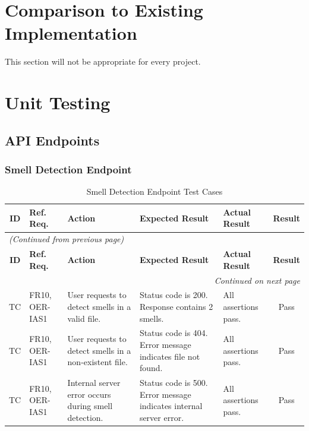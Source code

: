 \documentclass[12pt, titlepage]{article}
\begin{document}
\section{Comparison to Existing Implementation}	

This section will not be appropriate for every project.

\section{Unit Testing}
\newcommand{\testcount}{\stepcounter{testcase}\thetestcase}
\renewcommand{\arraystretch}{1.2} %

\subsection{API Endpoints}

\subsubsection{Smell Detection Endpoint}

\begin{longtable}{c 
  >{\raggedright\arraybackslash}p{1.5cm} 
  >{\raggedright\arraybackslash}p{4.5cm} 
  >{\raggedright\arraybackslash}p{4cm} 
  >{\raggedright\arraybackslash}p{3cm} c}
  \toprule
  \textbf{ID} & \textbf{Ref. Req.} & \textbf{Action} & \textbf{Expected Result} & \textbf{Actual Result} & \textbf{Result} \\ 
  \midrule
  \endfirsthead

  \multicolumn{6}{l}{\textit{(Continued from previous page)}} \\ 
  \toprule
  \textbf{ID} & \textbf{Ref. Req.} & \textbf{Action} & \textbf{Expected Result} & \textbf{Actual Result} & \textbf{Result} \\ 
  \midrule
  \endhead

  \multicolumn{6}{r}{\textit{Continued on next page}} \\
  \endfoot

  \bottomrule
  \caption{Smell Detection Endpoint Test Cases}
  \label{table:detection_endpoint_tests}
  \endlastfoot

  TC\testcount & FR10, OER-IAS1 & User requests to detect smells in a valid file. & Status code is 200. Response contains 2 smells. & All assertions pass. & \cellcolor{green} Pass \\ \midrule
  TC\testcount & FR10, OER-IAS1 & User requests to detect smells in a non-existent file. & Status code is 404. Error message indicates file not found. & All assertions pass. & \cellcolor{green} Pass \\ \midrule
  TC\testcount & FR10, OER-IAS1 & Internal server error occurs during smell detection. & Status code is 500. Error message indicates internal server error. & All assertions pass. & \cellcolor{green} Pass \\ 
\end{longtable}
\end{document}
